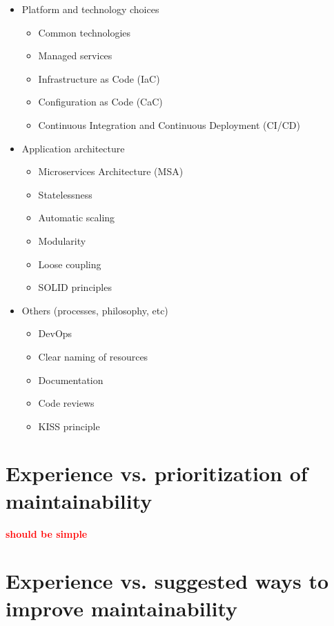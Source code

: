 \documentclass[utf8,english]{gradu3}
\newcommand{\todo}[1]{\textbf{\textcolor{red}{#1}}}
\begin{document}
\begin{itemize}
  \item Platform and technology choices
        \begin{itemize}
          \item Common technologies
          \item Managed services
          \item Infrastructure as Code (IaC)
          \item Configuration as Code (CaC)
          \item Continuous Integration and Continuous Deployment (CI/CD)
        \end{itemize}
  \item Application architecture
        \begin{itemize}
          \item Microservices Architecture (MSA)
          \item Statelessness
          \item Automatic scaling
          \item Modularity
          \item Loose coupling
          \item SOLID principles
        \end{itemize}
  \item Others (processes, philosophy, etc)
        \begin{itemize}
          \item DevOps
          \item Clear naming of resources
          \item Documentation
          \item Code reviews
          \item KISS principle
        \end{itemize}
\end{itemize}

\section{Experience vs. prioritization of maintainability}

\todo{should be simple}

\section{Experience vs. suggested ways to improve maintainability}
\end{document}
